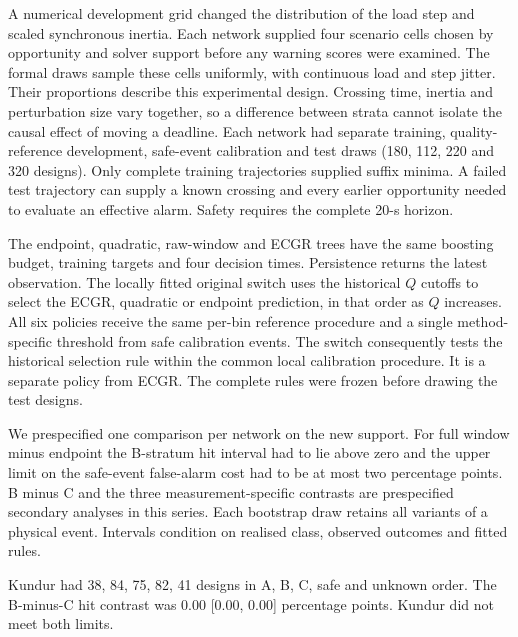 \documentclass[10pt]{article}
\begin{document}
A numerical development grid changed the distribution of the load step and scaled synchronous inertia. Each network supplied four scenario cells chosen by opportunity and solver support before any warning scores were examined. The formal draws sample these cells uniformly, with continuous load and step jitter. Their proportions describe this experimental design. Crossing time, inertia and perturbation size vary together, so a difference between strata cannot isolate the causal effect of moving a deadline. Each network had separate training, quality-reference development, safe-event calibration and test draws (180, 112, 220 and 320 designs). Only complete training trajectories supplied suffix minima. A failed test trajectory can supply a known crossing and every earlier opportunity needed to evaluate an effective alarm. Safety requires the complete 20-s horizon.

The endpoint, quadratic, raw-window and ECGR trees have the same boosting budget, training targets and four decision times. Persistence returns the latest observation. The locally fitted original switch uses the historical $Q$ cutoffs to select the ECGR, quadratic or endpoint prediction, in that order as $Q$ increases. All six policies receive the same per-bin reference procedure and a single method-specific threshold from safe calibration events. The switch consequently tests the historical selection rule within the common local calibration procedure. It is a separate policy from ECGR. The complete rules were frozen before drawing the test designs.

We prespecified one comparison per network on the new support. For full window minus endpoint the B-stratum hit interval had to lie above zero and the upper limit on the safe-event false-alarm cost had to be at most two percentage points. B minus C and the three measurement-specific contrasts are prespecified secondary analyses in this series. Each bootstrap draw retains all variants of a physical event. Intervals condition on realised class, observed outcomes and fitted rules.

Kundur had 38, 84, 75, 82, 41 designs in A, B, C, safe and unknown order. The B-minus-C hit contrast was 0.00 [0.00, 0.00] percentage points. Kundur did not meet both limits.
\end{document}
